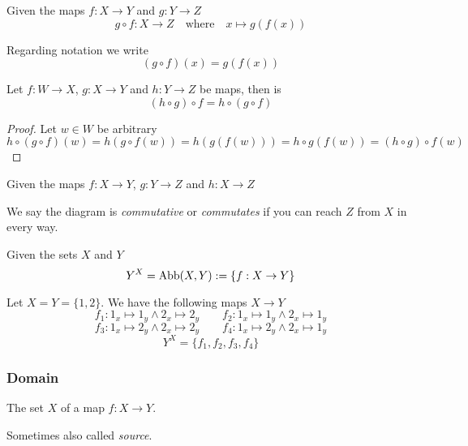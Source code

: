 \begin{definition}
   Given the maps \(f: X \to Y\) and \(g: Y \to Z\)
   \[g \circ f: X \to Z \quad\text{where}\quad x \mapsto g(f(x))\]
\end{definition}
\begin{remark}
   Regarding notation we write
   \[(g \circ f)(x) = g(f(x))\]
\end{remark}

\begin{proposition}
   Let \(f: W \to X\), \(g: X \to Y\) and \(h: Y \to Z\) be maps, then is
   \[(h \circ g) \circ f = h \circ (g \circ f)\]
\end{proposition}
\begin{proof}
   Let \(w \in W\) be arbitrary
   \[h \circ (g \circ f)(w) = h(g \circ f(w)) = h(g(f(w))) = h \circ g(f(w)) = (h \circ g) \circ f(w)\]
\end{proof}

\begin{definition}
   Given the maps \(f: X \to Y\), \(g: Y \to Z\) and \(h: X \to Z\)
   \begin{center}
   \end{center}
\end{definition}
\begin{remark}[Terminology]
   We say the diagram is \emph{commutative} or \emph{commutates} if you can reach \(Z\) from \(X\) in every way.
\end{remark}

\begin{definition}
   Given the sets \(X\) and \(Y\)
   \[Y^X = \operatorname{Abb}(X, Y) := \{f: X \to Y\}\]
\end{definition}
\begin{example}
   Let \(X = Y = \{1, 2\}\).
   We have the following maps \(X \to Y\)
   \[f_1: 1_x \mapsto 1_y \land 2_x \mapsto 2_y \qquad f_2: 1_x \mapsto 1_y \land 2_x \mapsto 1_y\]
   \[f_3: 1_x \mapsto 2_y \land 2_x \mapsto 2_y \qquad f_4: 1_x \mapsto 2_y \land 2_x \mapsto 1_y\]
   \[Y^X = \{f_1, f_2, f_3, f_4\}\]
\end{example}

\subsubsection{Domain}
\begin{definition}\label{def:domain}
   The set \(X\) of a map \(f: X \to Y\).
\end{definition}
\begin{remark}[Terminology]
   Sometimes also called \emph{source}.
\end{remark}


